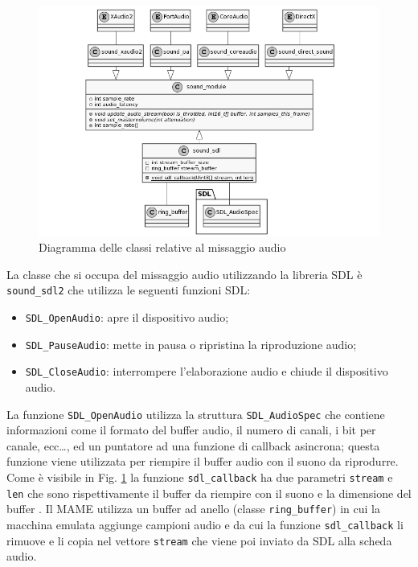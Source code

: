 \begin{figure}[H]
	\includegraphics[width=\linewidth]{immagini/class_mixingSDLFull}
	\caption{Diagramma delle classi relative al missaggio audio}
	\label{fig:class_mixingSDLFull}
\end{figure}

La classe che si occupa del missaggio audio utilizzando la libreria SDL è \verb|sound_sdl2| che utilizza le seguenti funzioni SDL:

\begin{itemize}	
	\item \verb|SDL_OpenAudio|: apre il dispositivo audio;
	\item \verb|SDL_PauseAudio|: mette in pausa o ripristina la riproduzione audio;
	\item \verb|SDL_CloseAudio|: interrompere l'elaborazione audio e chiude il dispositivo audio.
\end{itemize}

La funzione \verb|SDL_OpenAudio| utilizza la struttura \verb|SDL_AudioSpec| che contiene informazioni come il formato del buffer audio, il numero di canali, i bit per canale, ecc\dots, ed un puntatore ad una funzione di callback asincrona; questa funzione viene utilizzata per riempire il buffer audio con il suono da riprodurre. Come è visibile in Fig. \ref{fig:class_mixingSDLFull} la funzione \verb|sdl_callback| ha due parametri \verb|stream| e \verb|len| che sono rispettivamente il buffer da riempire con il suono e la dimensione del buffer \parencite{FocusOnSDL}. Il MAME utilizza un buffer ad anello (classe \verb|ring_buffer|) in cui la macchina emulata aggiunge campioni audio e da cui la funzione \verb|sdl_callback| li rimuove e li copia nel vettore \verb|stream| che viene poi inviato da SDL alla scheda audio.



